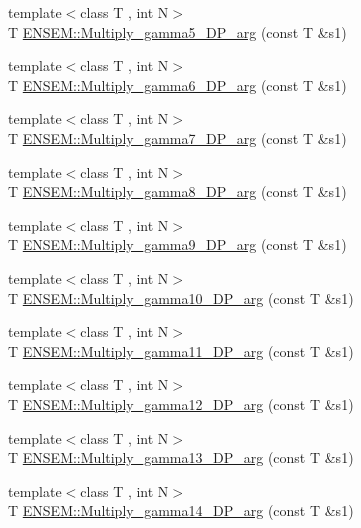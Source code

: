 \begin{DoxyCompactItemize}
\item 
{\footnotesize template$<$class T , int N$>$ }\\T \mbox{\hyperlink{namespaceENSEM_a90a385ec1dc402e6976dbbd79cdb8cc7}{E\+N\+S\+E\+M\+::\+Multiply\+\_\+gamma5\+\_\+\+D\+P\+\_\+arg}} (const T \&s1)
\item 
{\footnotesize template$<$class T , int N$>$ }\\T \mbox{\hyperlink{namespaceENSEM_ac67ae153a00fc0bed76abd99e4673dd1}{E\+N\+S\+E\+M\+::\+Multiply\+\_\+gamma6\+\_\+\+D\+P\+\_\+arg}} (const T \&s1)
\item 
{\footnotesize template$<$class T , int N$>$ }\\T \mbox{\hyperlink{namespaceENSEM_ad660e49ac580eb428198d8e36340ec63}{E\+N\+S\+E\+M\+::\+Multiply\+\_\+gamma7\+\_\+\+D\+P\+\_\+arg}} (const T \&s1)
\item 
{\footnotesize template$<$class T , int N$>$ }\\T \mbox{\hyperlink{namespaceENSEM_a583fae06358258391aea7892702ac919}{E\+N\+S\+E\+M\+::\+Multiply\+\_\+gamma8\+\_\+\+D\+P\+\_\+arg}} (const T \&s1)
\item 
{\footnotesize template$<$class T , int N$>$ }\\T \mbox{\hyperlink{namespaceENSEM_a602908f02281a8e9841c857d21bf9e4b}{E\+N\+S\+E\+M\+::\+Multiply\+\_\+gamma9\+\_\+\+D\+P\+\_\+arg}} (const T \&s1)
\item 
{\footnotesize template$<$class T , int N$>$ }\\T \mbox{\hyperlink{namespaceENSEM_ad9734f79b04e6191b2edc36dd14e6da7}{E\+N\+S\+E\+M\+::\+Multiply\+\_\+gamma10\+\_\+\+D\+P\+\_\+arg}} (const T \&s1)
\item 
{\footnotesize template$<$class T , int N$>$ }\\T \mbox{\hyperlink{namespaceENSEM_a1d3654f9af27c70c78514a313cfc9d10}{E\+N\+S\+E\+M\+::\+Multiply\+\_\+gamma11\+\_\+\+D\+P\+\_\+arg}} (const T \&s1)
\item 
{\footnotesize template$<$class T , int N$>$ }\\T \mbox{\hyperlink{namespaceENSEM_a912dc326057809bf0a27f06913ddbf55}{E\+N\+S\+E\+M\+::\+Multiply\+\_\+gamma12\+\_\+\+D\+P\+\_\+arg}} (const T \&s1)
\item 
{\footnotesize template$<$class T , int N$>$ }\\T \mbox{\hyperlink{namespaceENSEM_a48323c568aeb5bcdc0c398521f124a66}{E\+N\+S\+E\+M\+::\+Multiply\+\_\+gamma13\+\_\+\+D\+P\+\_\+arg}} (const T \&s1)
\item 
{\footnotesize template$<$class T , int N$>$ }\\T \mbox{\hyperlink{namespaceENSEM_afea32aec2f20f6bef65800f628aa2ac6}{E\+N\+S\+E\+M\+::\+Multiply\+\_\+gamma14\+\_\+\+D\+P\+\_\+arg}} (const T \&s1)

\end{DoxyCompactItemize}
